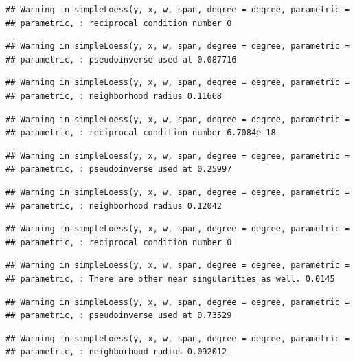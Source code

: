 \documentclass[]{article}
\begin{document}
\begin{verbatim}
## Warning in simpleLoess(y, x, w, span, degree = degree, parametric =
## parametric, : reciprocal condition number 0
\end{verbatim}

\begin{verbatim}
## Warning in simpleLoess(y, x, w, span, degree = degree, parametric =
## parametric, : pseudoinverse used at 0.087716
\end{verbatim}

\begin{verbatim}
## Warning in simpleLoess(y, x, w, span, degree = degree, parametric =
## parametric, : neighborhood radius 0.11668
\end{verbatim}

\begin{verbatim}
## Warning in simpleLoess(y, x, w, span, degree = degree, parametric =
## parametric, : reciprocal condition number 6.7084e-18
\end{verbatim}

\begin{verbatim}
## Warning in simpleLoess(y, x, w, span, degree = degree, parametric =
## parametric, : pseudoinverse used at 0.25997
\end{verbatim}

\begin{verbatim}
## Warning in simpleLoess(y, x, w, span, degree = degree, parametric =
## parametric, : neighborhood radius 0.12042
\end{verbatim}

\begin{verbatim}
## Warning in simpleLoess(y, x, w, span, degree = degree, parametric =
## parametric, : reciprocal condition number 0
\end{verbatim}

\begin{verbatim}
## Warning in simpleLoess(y, x, w, span, degree = degree, parametric =
## parametric, : There are other near singularities as well. 0.0145
\end{verbatim}

\begin{verbatim}
## Warning in simpleLoess(y, x, w, span, degree = degree, parametric =
## parametric, : pseudoinverse used at 0.73529
\end{verbatim}

\begin{verbatim}
## Warning in simpleLoess(y, x, w, span, degree = degree, parametric =
## parametric, : neighborhood radius 0.092012
\end{verbatim}
\end{document}
